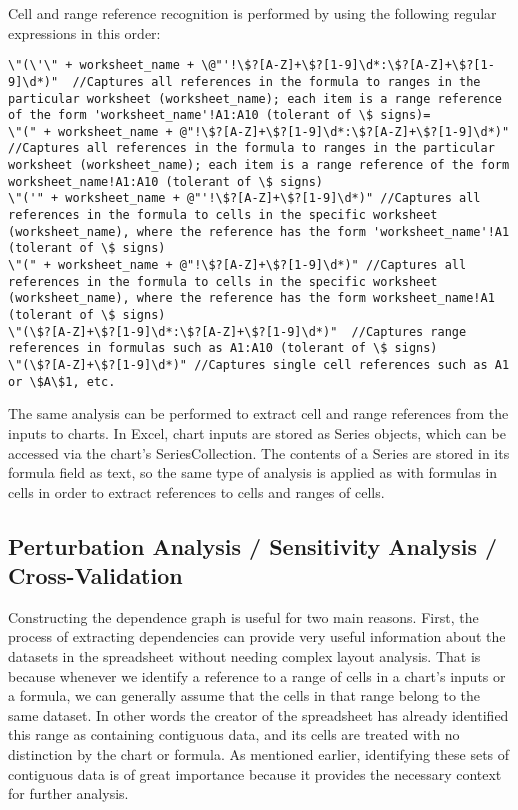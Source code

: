 {Cell and range reference recognition is performed by using the following
regular expressions in this order:
\begin{verbatim}
\"(\'\" + worksheet_name + \@"'!\$?[A-Z]+\$?[1-9]\d*:\$?[A-Z]+\$?[1-9]\d*)"  //Captures all references in the formula to ranges in the particular worksheet (worksheet_name); each item is a range reference of the form 'worksheet_name'!A1:A10 (tolerant of \$ signs)=
\"(" + worksheet_name + @"!\$?[A-Z]+\$?[1-9]\d*:\$?[A-Z]+\$?[1-9]\d*)"  //Captures all references in the formula to ranges in the particular worksheet (worksheet_name); each item is a range reference of the form worksheet_name!A1:A10 (tolerant of \$ signs)
\"('" + worksheet_name + @"'!\$?[A-Z]+\$?[1-9]\d*)" //Captures all references in the formula to cells in the specific worksheet (worksheet_name), where the reference has the form 'worksheet_name'!A1 (tolerant of \$ signs)
\"(" + worksheet_name + @"!\$?[A-Z]+\$?[1-9]\d*)" //Captures all references in the formula to cells in the specific worksheet (worksheet_name), where the reference has the form worksheet_name!A1 (tolerant of \$ signs)
\"(\$?[A-Z]+\$?[1-9]\d*:\$?[A-Z]+\$?[1-9]\d*)"  //Captures range references in formulas such as A1:A10 (tolerant of \$ signs)
\"(\$?[A-Z]+\$?[1-9]\d*)" //Captures single cell references such as A1 or \$A\$1, etc.
\end{verbatim}

The same analysis can be performed to extract cell and range references 
from the inputs to charts. In Excel, chart inputs are stored as Series objects, 
which can be accessed via the chart's SeriesCollection. The contents of a Series
are stored in its formula field as text, so the same type of analysis is applied
as with formulas in cells in order to extract references to cells and ranges of cells.

\subsection{Perturbation Analysis / Sensitivity Analysis / Cross-Validation}

Constructing the dependence graph is useful for two main
reasons. First, the process of extracting dependencies can provide
very useful information about the datasets in the spreadsheet without
needing complex layout analysis.  That is because whenever we identify
a reference to a range of cells in a chart's inputs or a formula,
we can generally assume that the cells in that range belong to the same dataset.  In
other words the creator of the spreadsheet has already identified this
range as containing contiguous data, and its cells are treated with no
distinction by the chart or formula.  As mentioned earlier,
identifying these sets of contiguous data is of great importance
because it provides the necessary context for further analysis.

}
